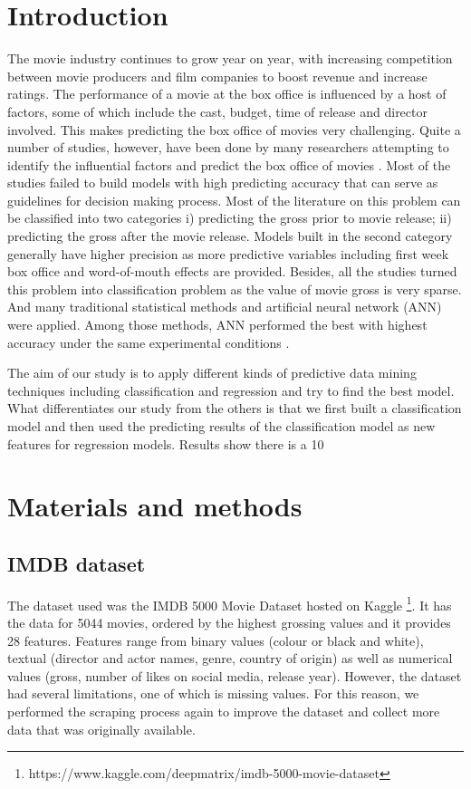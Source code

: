 \section{Introduction}
The movie industry continues to grow year on year, with increasing competition between movie producers and film companies to boost revenue and increase ratings. The performance of a movie at the box office is influenced by a host of factors, some of which include the cast, budget, time of release and director involved. This makes predicting the box office of movies very challenging. Quite a number of studies, however, have been done by many researchers attempting to identify the influential factors and predict the box office of movies \cite{sharda2006predicting}. Most of the studies failed to build models with high predicting accuracy that can serve as guidelines for decision making process. Most of the literature on this problem can be classified into two categories i) predicting the gross prior to movie release; ii) predicting the gross after the movie release. Models built in the second category generally have higher precision as more predictive variables including first week box office and word-of-mouth effects are provided. Besides, all the studies turned this problem into classification problem as the value of movie gross is very sparse.  And many traditional statistical methods and artificial neural network (ANN) were applied. Among those methods, ANN performed the best with highest accuracy under the same experimental conditions \cite{sharda2006predicting}.
 
The aim of our study is to apply different kinds of predictive data mining techniques including classification and regression and try to find the best model. What differentiates our study from the others is that we first built a classification model and then used the predicting results of the classification model as new features for regression models. Results show there is a 10%


\section{Materials and methods}

\subsection{IMDB dataset}
The dataset used was the IMDB 5000 Movie Dataset hosted on Kaggle \footnote{https://www.kaggle.com/deepmatrix/imdb-5000-movie-dataset}. It has the data for 5044 movies, ordered by the highest grossing values and it provides 28 features. Features range from binary values (colour or black and white), textual (director and actor names, genre, country of origin) as well as numerical values (gross, number of likes on social media, release year).  However, the dataset had several limitations, one of which is missing values. For this reason, we performed the scraping process again to improve the dataset and collect more data that was originally available.


